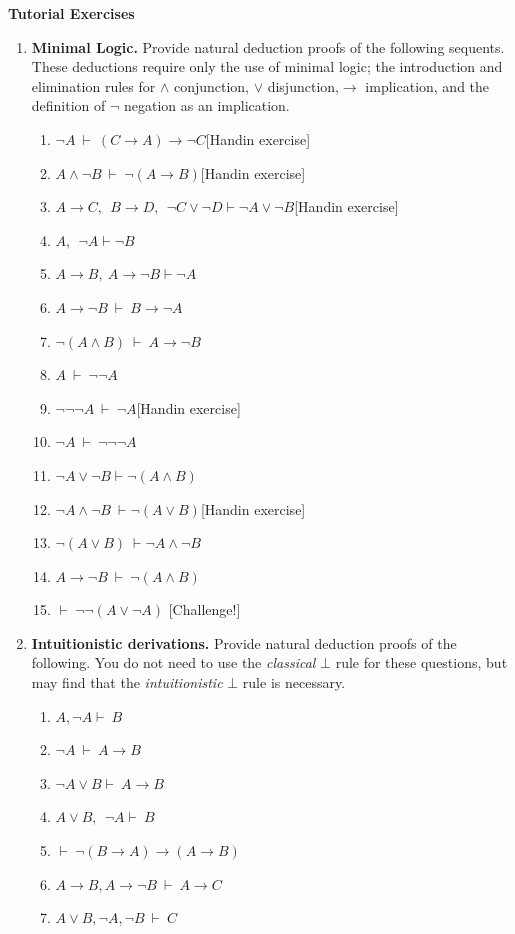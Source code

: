 \documentclass[11pt]{report}
\begin{document}
\newpage
{\bf Tutorial Exercises}
\begin{enumerate}

	\item \textbf{Minimal Logic.} Provide natural deduction proofs of the following sequents. These deductions require only the use of minimal logic; the introduction and elimination rules for $\land$ conjunction, $\lor$ disjunction,$\to$ implication, and the definition of $\lnot$ negation as an implication. 
	 
	\begin{enumerate}
		\item $\lnot A \ \vdash \ (C \to A) \to \lnot C$\hfill [Handin exercise]
		\item $A \land \lnot B \ \vdash \ \lnot (A \to B)$\hfill [Handin exercise]
		\item $ A\to  C,\ \  B \to  D,\ \ \neg C \lor \neg  D \vdash  \neg A\lor \neg  B$\hfill [Handin exercise]
		\item $ A,\ \ \neg  A\vdash  \neg  B$
		\item $ A\rightarrow B, \  A\rightarrow \lnot B \vdash \lnot  A$
		\item $A \to \lnot B \ \vdash \ B \to \lnot A$
		\item $\lnot (A \land B) \ \vdash \ A \to \lnot B$
		\item $A \ \vdash \ \lnot\lnot A$
		\item $\lnot \lnot \lnot A \ \vdash \ \lnot A$\hfill [Handin exercise]
		\item $\lnot A \ \vdash \ \lnot\lnot\lnot A$
		\item $\lnot A \lor \lnot B \vdash \lnot( A\land  B)$
		\item $\lnot  A\land \lnot  B \ \vdash \lnot( A \lor  B)$\hfill [Handin exercise]
		\item $\lnot( A \lor  B) \ \vdash \lnot  A\land \lnot  B$
		\item $A \to \lnot B \ \vdash \ \lnot (A \land B)$
		\item $\vdash \ \lnot\lnot (A \lor \lnot A)$ \hfill [Challenge!]
	\end{enumerate}

	\item \textbf{Intuitionistic derivations.} Provide natural deduction proofs of the following. You do not need to use the \emph{classical} $\bot$ rule for these questions, but may find that the \emph{intuitionistic} $\bot$ rule is necessary.
	 
	\begin{enumerate}
		\item $ A, \neg  A\vdash \ B$
		\item $\lnot A \ \vdash \ A \to B$ 
		\item $\neg  A\lor  B \vdash \ A\to B$ 
		\item $ A\lor  B,\ \ \neg A\vdash \ B$ 
		\item $ \vdash \ \lnot(B \to A) \to (A \to B)$
		\item $ A \to B, A \to \lnot B \ \vdash \ A \to C$
		\item $A \lor B, \lnot A, \lnot B \ \vdash \ C$
	\end{enumerate}

\end{enumerate}	
\end{document}
